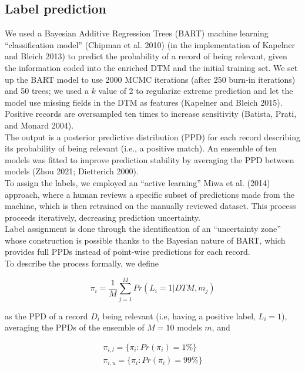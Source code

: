 \documentclass{article}
\begin{document}
\hypertarget{label-prediction}{%
\subsection{Label prediction}\label{label-prediction}}

We used a Bayesian Additive Regression Trees (BART) machine learning
``classification model'' (Chipman et al. 2010) (in the implementation of
Kapelner and Bleich 2013) to predict the probability of a record of
being relevant, given the information coded into the enriched DTM and
the initial training set. We set up the BART model to use 2000 MCMC
iterations (after 250 burn-in iterations) and 50 trees; we used a \(k\)
value of 2 to regularize extreme prediction and let the model use
missing fields in the DTM as features (Kapelner and Bleich 2015).
Positive records are oversampled ten times to increase sensitivity
(Batista, Prati, and Monard 2004).\\
The output is a posterior predictive distribution (PPD) for each record
describing its probability of being relevant (i.e., a positive match).
An ensemble of ten models was fitted to improve prediction stability by
averaging the PPD between models (Zhou 2021; Dietterich 2000).\\

To assign the labels, we employed an ``active learning'' Miwa et al.
(2014) approach, where a human reviews a specific subset of predictions
made from the machine, which is then retrained on the manually reviewed
dataset. This process proceeds iteratively, decreasing prediction
uncertainty.\\
Label assignment is done through the identification of an ``uncertainty
zone'' whose construction is possible thanks to the Bayesian nature of
BART, which provides full PPDs instead of point-wise predictions for
each record.\\
To describe the process formally, we define

\[\pi_i = \frac{1}{M}\sum_{j=1}^M Pr(L_i = \text{1}|DTM,m_j)\]

as the PPD of a record \(D_i\) being relevant (i.e, having a positive
label, \(L_i = 1\)), averaging the PPDs of the ensemble of \(M=10\)
models \(m\), and

\[
\begin{aligned}
\pi_{i,l} = \{\pi_i : Pr(\pi_i) = 1\%\}\\
\pi_{i,u} = \{\pi_i : Pr(\pi_i) = 99\%\}
\end{aligned}
\]
\end{document}
